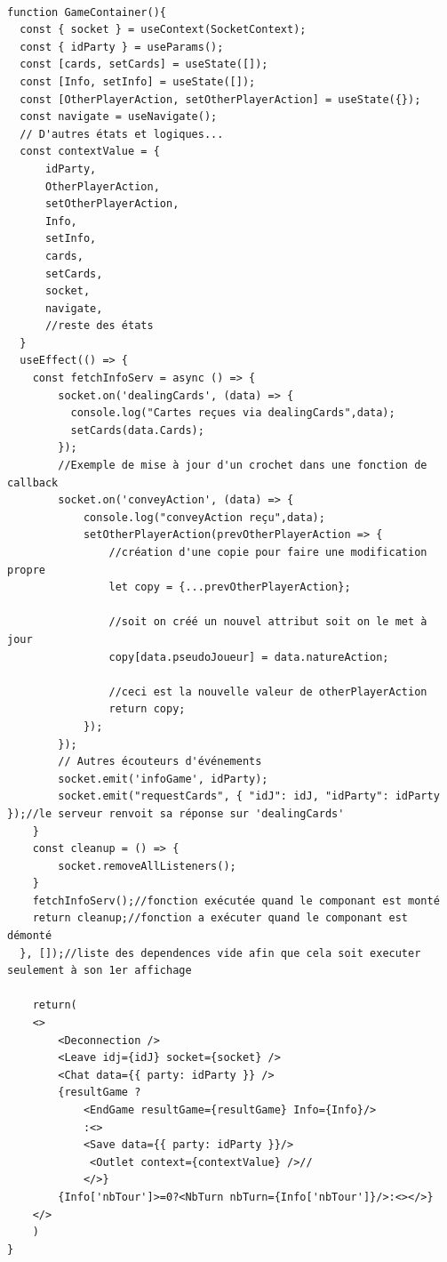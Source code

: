 \documentclass[a4paper]{article}
\begin{document}
\begin{verbatim}

function GameContainer(){
  const { socket } = useContext(SocketContext);
  const { idParty } = useParams();
  const [cards, setCards] = useState([]);
  const [Info, setInfo] = useState([]);
  const [OtherPlayerAction, setOtherPlayerAction] = useState({});
  const navigate = useNavigate();
  // D'autres états et logiques...
  const contextValue = {
      idParty,
      OtherPlayerAction,
      setOtherPlayerAction,
      Info,
      setInfo,
      cards,
      setCards,   
      socket,
      navigate,
      //reste des états
  }
  useEffect(() => {
    const fetchInfoServ = async () => {
        socket.on('dealingCards', (data) => {
          console.log("Cartes reçues via dealingCards",data);
          setCards(data.Cards);
        });
        //Exemple de mise à jour d'un crochet dans une fonction de callback
        socket.on('conveyAction', (data) => {
            console.log("conveyAction reçu",data);
            setOtherPlayerAction(prevOtherPlayerAction => {
                //création d'une copie pour faire une modification propre
                let copy = {...prevOtherPlayerAction};
                
                //soit on créé un nouvel attribut soit on le met à jour
                copy[data.pseudoJoueur] = data.natureAction;

                //ceci est la nouvelle valeur de otherPlayerAction
                return copy;
            });
        });
        // Autres écouteurs d'événements
        socket.emit('infoGame', idParty);
        socket.emit("requestCards", { "idJ": idJ, "idParty": idParty });//le serveur renvoit sa réponse sur 'dealingCards'
    }
    const cleanup = () => {
        socket.removeAllListeners();
    }
    fetchInfoServ();//fonction exécutée quand le componant est monté
    return cleanup;//fonction a exécuter quand le componant est démonté 
  }, []);//liste des dependences vide afin que cela soit executer seulement à son 1er affichage

    return(
    <>
        <Deconnection />
        <Leave idj={idJ} socket={socket} />
        <Chat data={{ party: idParty }} />
        {resultGame ?
            <EndGame resultGame={resultGame} Info={Info}/>
            :<>
            <Save data={{ party: idParty }}/>
             <Outlet context={contextValue} />//
            </>}
        {Info['nbTour']>=0?<NbTurn nbTurn={Info['nbTour']}/>:<></>}
    </>
    )
}
\end{verbatim}
\end{document}
